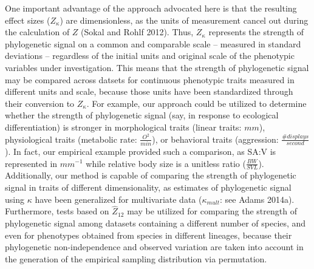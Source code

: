 \documentclass[
]{article}
\begin{document}
{One important advantage of the approach advocated here is that the
resulting effect sizes (\(Z_\kappa\)) are dimensionless, as the units of
measurement cancel out during the calculation of \(Z\) (Sokal and Rohlf
2012). Thus, \(Z_\kappa\) represents the strength of phylogenetic signal
on a common and comparable scale -- measured in standard deviations --
regardless of the initial units and original scale of the phenotypic
variables under investigation. This means that the strength of
phylogenetic signal may be compared across datsets for continuous
phenotypic traits measured in different units and scale, because those
units have been standardized through their conversion to \(Z_\kappa\).
For example, our approach could be utilized to determine whether the
strength of phylogenetic signal (say, in response to ecological
differentiation) is stronger in morphological traits (linear traits:
\(mm\)), physiological traits (metabolic rate: \(\frac{O^2}{min}\)), or
behavioral traits (aggression: \(\frac{\#{displays}}{second}\)). In
fact, our empirical example provided such a comparison, as SA:V is
represented in \(mm^{-1}\) while relative body size is a unitless ratio
(\(\frac{BW}{SVL}\)). Additionally, our method is capable of comparing
the strength of phylogenetic signal in traits of different
dimensionality, as estimates of phylogenetic signal using \(\kappa\)
have been generalized for multivariate data (\(\kappa_{mult}\): see
Adams 2014a). Furthermore, tests based on \(\hat{Z}_{12}\) may be
utilized for comparing the strength of phylogenetic signal among
datasets containing a different number of species, and even for
phenotypes obtained from species in different lineages, because their
phylogenetic non-independence and observed variation are taken into
account in the generation of the empirical sampling distribution via
permutation. \hfill\break

}
\end{document}
